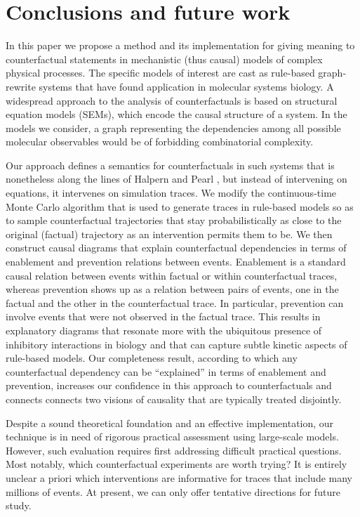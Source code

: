 
\section*{Conclusions and future work}

In this paper we propose a method and its implementation for giving meaning to
counterfactual statements in mechanistic (thus causal) models of complex
physical processes. The specific models of interest are cast as rule-based
graph-rewrite systems that have found application in molecular systems biology.
A widespread approach to the analysis of counterfactuals is based on structural
equation models (SEMs), which encode the causal structure of a system. In the
models we consider, a graph representing the dependencies among all possible
molecular observables would be of forbidding combinatorial complexity.

Our approach defines a semantics for counterfactuals in such systems that is
nonetheless along the lines of Halpern and Pearl
\cite{pearl2009causality,halpern2016actual}, but instead of intervening on
equations, it intervenes on simulation traces. We modify the continuous-time
Monte Carlo algorithm that is used to generate traces in rule-based models so as
to sample counterfactual trajectories that stay probabilistically as close to
the original (factual) trajectory as an intervention permits them to be. We then
construct causal diagrams that explain counterfactual dependencies in terms of
enablement and prevention relations between events. Enablement is a standard
causal relation between events within factual or within counterfactual traces,
whereas prevention shows up as a relation between pairs of events, one in the
factual and the other in the counterfactual trace. In particular, prevention can
involve events that were not observed in the factual trace. This results in
explanatory diagrams that resonate more with the ubiquitous presence of
inhibitory interactions in biology and that can capture subtle kinetic aspects
of rule-based models.  Our completeness result, according to which any
counterfactual dependency can be ``explained'' in terms of enablement and
prevention, increases our confidence in this approach to counterfactuals and
connects connects two visions of causality that are typically treated
disjointly.

Despite a sound theoretical foundation and an effective implementation, our technique is in need of rigorous practical assessment using large-scale
models. However, such evaluation requires first addressing difficult practical
questions. Most notably, which counterfactual experiments are worth trying? It
is entirely unclear a priori which interventions are informative for traces that
include many millions of events. At present, we can only offer tentative
directions for future study.

